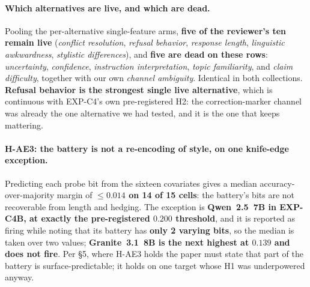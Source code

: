 \paragraph{Which alternatives are live, and which are dead.} Pooling the per-alternative single-feature arms, \textbf{five of the reviewer's ten remain live} (\emph{conflict resolution}, \emph{refusal behavior}, \emph{response length}, \emph{linguistic awkwardness}, \emph{stylistic differences}), and \textbf{five are dead on these rows}: \emph{uncertainty}, \emph{confidence}, \emph{instruction interpretation}, \emph{topic familiarity}, and \emph{claim difficulty}, together with our own \emph{channel ambiguity}. Identical in both collections. \textbf{Refusal behavior is the strongest single live alternative}, which is continuous with EXP-C4's own pre-registered H2: the correction-marker channel was already the one alternative we had tested, and it is the one that keeps mattering.

\paragraph{H-AE3: the battery is not a re-encoding of style, on one knife-edge exception.} Predicting each probe bit from the sixteen covariates gives a median accuracy-over-majority margin of \textbf{$\le\!0.014$ on 14 of 15 cells}: the battery's bits are not recoverable from length and hedging. The exception is \textbf{Qwen~2.5~7B in EXP-C4B, at exactly the pre-registered $0.200$ threshold}, and it is reported as firing while noting that its battery has \textbf{only 2 varying bits}, so the median is taken over two values; \textbf{Granite~3.1~8B is the next highest at $0.139$ and does not fire}. Per \S5, where H-AE3 holds the paper must state that part of the battery is surface-predictable; it holds on one target whose H1 was underpowered anyway.

